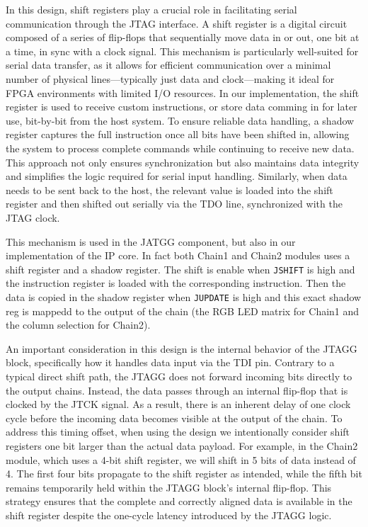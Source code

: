\documentclass[a4paper,11pt,oneside]{report}
\begin{document}
In this design, shift registers play a crucial role in facilitating serial communication through the JTAG interface. 
A shift register is a digital circuit composed of a series of flip-flops that sequentially move data in or out, one bit at a time, in sync with a clock signal. 
This mechanism is particularly well-suited for serial data transfer, as it allows for efficient communication over a minimal number of physical lines—typically just data
 and clock—making it ideal for FPGA environments with limited I/O resources. 
In our implementation, the shift register is used to receive custom instructions, or store data comming in for later use, bit-by-bit from the host system. 
To ensure reliable data handling, a shadow register captures the full instruction once all bits have been shifted in, allowing the system to process complete commands while continuing to receive new data. 
This approach not only ensures synchronization but also maintains data integrity and simplifies the logic required for serial input handling.
Similarly, when data needs to be sent back to the host, the relevant value is loaded into the shift register and then shifted out serially via the TDO line, synchronized with the JTAG clock.

This mechanism is used in the JATGG component, but also in our implementation of the IP core. In fact both Chain1 and Chain2 modules uses a shift register and a shadow register.
The shift is enable when \texttt{JSHIFT} is high and the instruction register is loaded with the corresponding instruction. Then the data is copied in 
the shadow register when \texttt{JUPDATE} is high and this exact shadow reg is mappedd to the output of the chain (the RGB LED matrix for Chain1 and the column selection for Chain2).

An important consideration in this design is the internal behavior of the JTAGG block, specifically how it handles data input via the TDI pin. 
Contrary to a typical direct shift path, the JTAGG does not forward incoming bits directly to the output chains.
 Instead, the data passes through an internal flip-flop that is clocked by the JTCK signal. 
 As a result, there is an inherent delay of one clock cycle before the incoming data becomes visible at the output of the chain. 
 To address this timing offset, when using the design we intentionally consider shift registers one bit larger than the actual data payload.
For example, in the Chain2 module, which uses a 4-bit shift register, we will shift in 5 bits of data instead of 4. 
The first four bits propagate to the shift register as intended, while the fifth bit remains temporarily held within the JTAGG block's internal flip-flop. 
This strategy ensures that the complete and correctly aligned data is available in the shift register despite the one-cycle latency introduced by the JTAGG logic.
\end{document}
